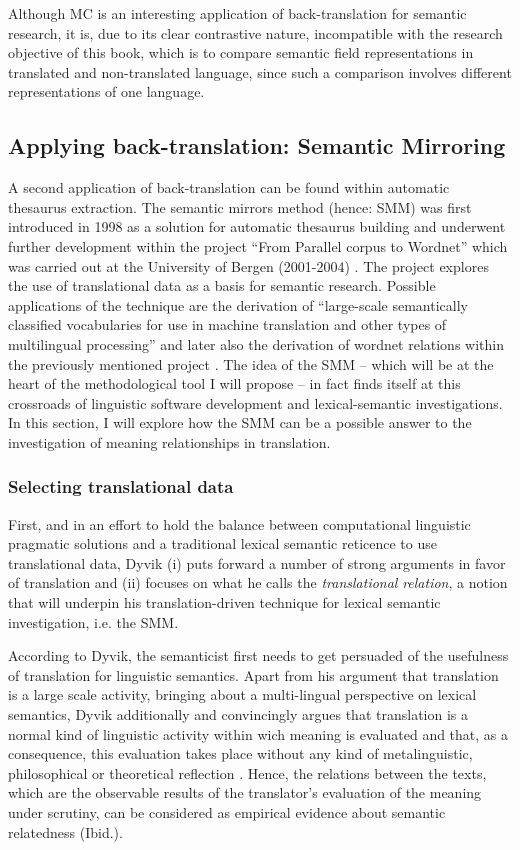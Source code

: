 Although MC is an interesting application of back-translation for semantic research, it is, due to its clear contrastive nature, incompatible with the research objective of this book, which is to compare semantic field representations in translated and non-translated language, since such a comparison involves different representations of one language.

\subsection{Applying back-translation: Semantic Mirroring}
\label{sec:2.3.4} 
A second application of back-translation can be found within automatic thesaurus extraction. The semantic mirrors method (hence: SMM) was first introduced in 1998 as a solution for automatic thesaurus building and underwent further development within the project “From Parallel corpus to Wordnet” which was carried out at the University of Bergen (2001-2004) \citep[311]{aijmer_translations_2004}. The project explores the use of translational data as a basis for semantic research. Possible applications of the technique are the derivation of “large-scale semantically classified vocabularies for use in machine translation and other types of multilingual processing” \citep[51]{johansson_translational_1998} and later also the derivation of wordnet relations within the previously mentioned project \citep[311]{aijmer_translations_2004}. The idea of the SMM – which will be at the heart of the methodological tool I will propose – in fact finds itself at this crossroads of linguistic software development and lexical-semantic investigations. In this section, I will explore how the SMM can be a possible answer to the investigation of meaning relationships in translation.

\subsubsection{\label{sec:2.3.4.1}  Selecting translational data}
First, and in an effort to hold the balance between computational linguistic pragmatic solutions and a traditional lexical semantic reticence to use translational data, Dyvik (i) puts forward a number of strong arguments in favor of translation and (ii) focuses on what he calls the \textit{translational} \textit{relation}, a notion that will underpin his translation-driven technique for lexical semantic investigation, i.e. the SMM.

According to Dyvik, the semanticist first needs to get persuaded of the usefulness of translation for linguistic semantics. Apart from his argument that translation is a large scale activity, bringing about a multi-lingual perspective on lexical semantics, Dyvik additionally and convincingly argues that translation is a normal kind of linguistic activity within wich meaning is evaluated and that, as a consequence, this evaluation takes place without any kind of metalinguistic, philosophical or theoretical reflection \citep[51]{johansson_translational_1998}. Hence, the relations between the texts, which are the observable results of the translator’s evaluation of the meaning under scrutiny, can be considered as empirical evidence about semantic relatedness (Ibid.).


